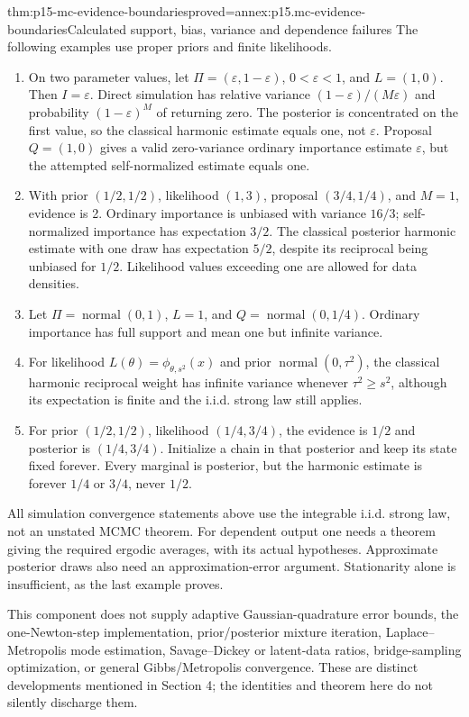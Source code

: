 \begin{hbtheorem}{thm:p15-mc-evidence-boundaries}{proved=annex:p15.mc-evidence-boundaries}{Calculated support, bias, variance and dependence failures}
The following examples use proper priors and finite likelihoods.
\begin{enumerate}
\item On two parameter values, let \(\Pi=(\varepsilon,1-\varepsilon)\),
\(0<\varepsilon<1\), and \(L=(1,0)\). Then \(I=\varepsilon\).
Direct simulation has relative variance
\((1-\varepsilon)/(M\varepsilon)\) and probability
\((1-\varepsilon)^M\) of returning zero. The posterior is concentrated
on the first value, so the classical harmonic estimate equals one,
not \(\varepsilon\). Proposal \(Q=(1,0)\) gives a valid zero-variance
ordinary importance estimate \(\varepsilon\), but the attempted
self-normalized estimate equals one.
\item With prior \((1/2,1/2)\), likelihood \((1,3)\), proposal
\((3/4,1/4)\), and \(M=1\), evidence is 2. Ordinary importance is
unbiased with variance \(16/3\); self-normalized importance has expectation
\(3/2\). The classical posterior harmonic estimate with one draw has
expectation \(5/2\), despite its reciprocal being unbiased for \(1/2\).
Likelihood values exceeding one are allowed for data densities.
\item Let \(\Pi=\operatorname{normal}(0,1)\), \(L=1\), and
\(Q=\operatorname{normal}(0,1/4)\). Ordinary importance has full support
and mean one but infinite variance.
\item For likelihood \(L(\theta)=\phi_{\theta,s^2}(x)\) and prior
\(\operatorname{normal}(0,\tau^2)\), the classical harmonic reciprocal
weight has infinite variance whenever \(\tau^2\geq s^2\), although
its expectation is finite and the i.i.d. strong law still applies.
\item For prior \((1/2,1/2)\), likelihood \((1/4,3/4)\), the evidence
is \(1/2\) and posterior is \((1/4,3/4)\). Initialize a chain in that
posterior and keep its state fixed forever. Every marginal is posterior,
but the harmonic estimate is forever \(1/4\) or \(3/4\), never \(1/2\).
\end{enumerate}
\end{hbtheorem}

All simulation convergence statements above use the integrable i.i.d.
strong law, not an unstated MCMC theorem. For dependent output one needs
a theorem giving the required ergodic averages, with its actual hypotheses.
Approximate posterior draws also need an approximation-error argument.
Stationarity alone is insufficient, as the last example proves.

This component does not supply adaptive Gaussian-quadrature error bounds,
the one-Newton-step implementation, prior/posterior mixture iteration,
Laplace--Metropolis mode estimation, Savage--Dickey or latent-data ratios,
bridge-sampling optimization, or general Gibbs/Metropolis convergence.
These are distinct developments mentioned in Section 4; the identities and
theorem here do not silently discharge them.
